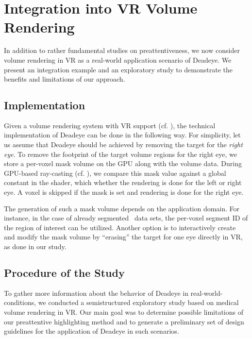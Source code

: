 \documentclass[journal]{vgtc}                %
\begin{document}





\section{Integration into VR Volume Rendering}

In addition to rather fundamental studies on preattentiveness, we now consider volume rendering in VR as a real-world application scenario of Deadeye. We present an integration example and an exploratory study to demonstrate the benefits and limitations of our approach.

\subsection{Implementation}

Given a volume rendering system with VR support (cf. \cite{kratz2006gpu,shen2008medvis}), the technical implementation of Deadeye can be done in the following way. For simplicity, let us assume that Deadeye should be achieved by removing the target for the \textit{right eye}. To remove the footprint of the target volume regions for the right eye, we store a per-voxel mask volume on the GPU along with the volume data. During GPU-based ray-casting (cf. \cite{kruger2003acceleration}), we compare this mask value against a global constant in the shader, which whether the rendering is done for the left or right eye. A voxel is skipped if the mask is set and rendering is done for the right eye. 

The generation of such a mask volume depends on the application domain. For instance, in the case of already segmented~\cite{litjens2017survey} data sets, the per-voxel segment ID of the region of interest can be utilized. Another option is to interactively create and modify the mask volume by ``erasing'' the target for one eye directly in VR, as done in our study.




\subsection{Procedure of the Study}
To gather more information about the behavior of Deadeye in real-world-conditions, we conducted a semistructured exploratory study based on medical volume rendering in VR. Our main goal was to determine possible limitations of our preattentive highlighting method and to generate a preliminary set of design guidelines for the application of Deadeye in such scenarios.
\end{document}
